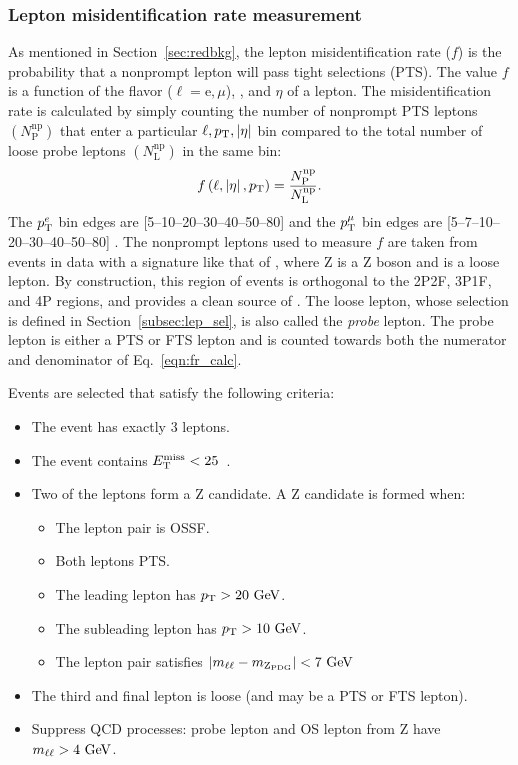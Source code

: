 \subsubsection{Lepton misidentification rate measurement}
\label{subsubsec:fr_evtsel}
As mentioned in Section~\ref{sec:redbkg}, the lepton misidentification rate ($f$) is the probability that a nonprompt lepton will pass tight selections (PTS).
The value $f$ is a function of the flavor ($\ell = \mathrm{e}, \mu$), \pt, and $\eta$ of a lepton.
The misidentification rate is calculated by simply counting the number of nonprompt PTS leptons $\left( N^{\mathrm{np}}_{\mathrm{P}} \right)$ that enter a particular $\ell, p_{\mathrm{T}}, \left| \eta \right|$ bin compared to the total number of loose probe leptons $\left( N^{\mathrm{np}}_{\mathrm{L}} \right)$ in the same bin:
\begin{equation}
	\label{eqn:fr_calc}
	f\left( \ell, \left| \eta \right|, p_{\mathrm{T}} \right) = 
	\frac{
		N^{\mathrm{np}}_{\mathrm{P}}
		}{
		N^{\mathrm{np}}_{\mathrm{L}}
		}.
\end{equation}
The $p_{\mathrm{T}}^e$ bin edges are [5--10--20--30--40--50--80] \GeV and the $p_{\mathrm{T}}^{\mu}$ bin edges are [5--7--10--20--30--40--50--80] \GeV.
The nonprompt leptons used to measure $f$ are taken from events in data with a signature like that of \ZplusL, where Z is a Z boson and \looselep is a loose lepton.
By construction, this region of events is orthogonal to the 2P2F, 3P1F, and 4P regions, and provides a clean source of \looselep.
The loose lepton, whose selection is defined in Section~\ref{subsec:lep_sel}, is also called the \emph{probe} lepton.
The probe lepton is either a PTS or FTS lepton and is counted towards both the numerator and denominator of Eq.~\ref{eqn:fr_calc}. 

Events are selected that satisfy the following criteria:
\begin{itemize}
	\item The event has exactly 3 leptons.
	\item The event contains $E_{\mathrm{T}}^{\text{miss}} < 25$~\GeV.
	\item Two of the leptons form a Z candidate. A Z candidate is formed when:
	\begin{itemize}
		\item The lepton pair is OSSF.
		\item Both leptons PTS.
		\item The leading lepton has $p_{\mathrm{T}} > 20~\mbox{GeV}$.
		\item The subleading lepton has $p_{\mathrm{T}} > 10~\mbox{GeV}$.
		\item The lepton pair satisfies $\left| m_{\ell\ell} - m_{\mathrm{Z}_{\text{PDG}}} \right| < 7~\mbox{GeV}$
	\end{itemize}
	\item The third and final lepton is loose (and may be a PTS or FTS lepton).
	\item Suppress QCD processes: probe lepton and OS lepton from Z have $m_{\ell\ell} > 4~\mbox{GeV}$.
\end{itemize}

